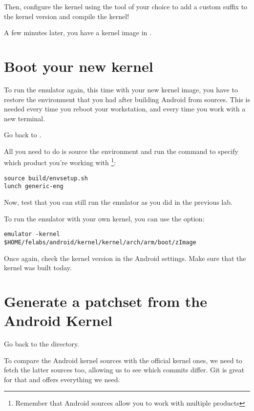 
Then, configure the kernel using the tool of your choice to add a
custom suffix to the kernel version and compile the kernel!


A few minutes later, you have a kernel image in .

\section{Boot your new kernel}

To run the emulator again, this time with your new kernel image, you
have to restore the environment that you had after building Android
from sources. This is needed every time you reboot your workstation,
and every time you work with a new terminal.

Go back to .

All you need to do is source the environment and run the 
command to specify which product you're working with
\footnote{Remember that Android sources allow you to work with
  multiple products}:

\begin{verbatim}
source build/envsetup.sh
lunch generic-eng
\end{verbatim}

Now, test that you can still run the emulator as you did in the
previous lab.

To run the emulator with your own kernel, you can use the
 option:

\begin{verbatim}
emulator -kernel $HOME/felabs/android/kernel/kernel/arch/arm/boot/zImage
\end{verbatim}

Once again, check the kernel version in the Android settings. Make
sure that the kernel was built today.

\section{Generate a patchset from the Android Kernel}

Go back to the  directory.

To compare the Android kernel sources with the official kernel ones,
we need to fetch the latter sources too, allowing us to see which
commits differ. Git is great for that and offers everything we need.

